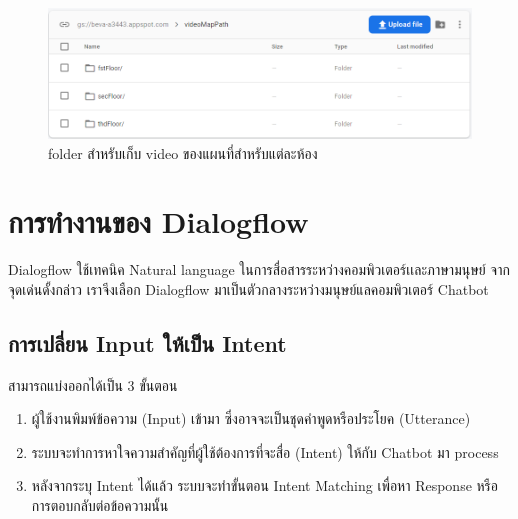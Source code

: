 \begin{figure}[hbt!]
  \begin{center}
    \includegraphics[width=\textwidth,keepaspectratio]{pic/db_storage_floorFolder.png}
  \end{center}
  \caption{folder สำหรับเก็บ video ของแผนที่สำหรับแต่ละห้อง}
  \label{fig:db_storage_floorFolder}
\end{figure}

\section{การทำงานของ Dialogflow}

Dialogflow ใช้เทคนิค Natural language ในการสื่อสารระหว่างคอมพิวเตอร์เเละภาษามนุษย์ จากจุดเด่นดั้งกล่าว เราจีงเลือก
Dialogflow มาเป็นตัวกลางระหว่างมนุษย์แลคอมพิวเตอร์ Chatbot~\cite{df-overview}
\subsection{การเปลี่ยน Input ให้เป็น Intent}
สามารถแบ่งออกได้เป็น 3 ขั้นตอน
\begin{enumerate}
  \item ผู้ใช้งานพิมพ์ข้อความ (Input) เข้ามา ซึ่งอาจจะเป็นชุดคำพูดหรือประโยค (Utterance)
  \item ระบบจะทำการหาใจความสำคัญที่ผู้ใช้ต้องการที่จะสื่อ (Intent) ให้กับ Chatbot มา process
  \item หลังจากระบุ Intent ได้แล้ว ระบบจะทำขั้นตอน Intent Matching เพื่อหา Response หรือการตอบกลับต่อข้อความนั้น
\end{enumerate}

